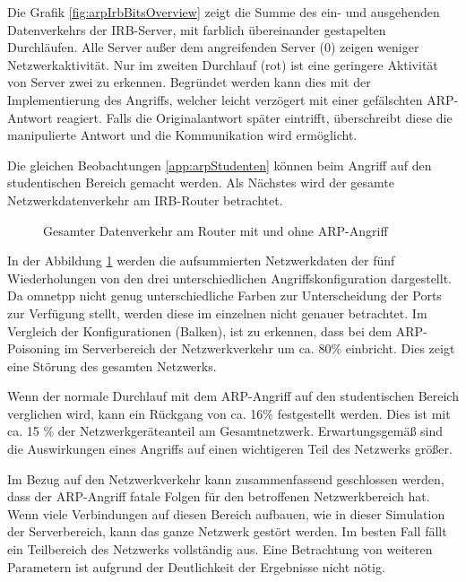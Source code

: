 Die Grafik \ref{fig:arpIrbBitsOverview} zeigt die Summe des ein- und ausgehenden Datenverkehrs der IRB-Server, mit farblich übereinander gestapelten Durchläufen. Alle Server außer dem angreifenden Server (0) zeigen weniger Netzwerkaktivität. Nur im zweiten Durchlauf (rot) ist eine geringere Aktivität von Server zwei zu erkennen. Begründet werden kann dies mit der Implementierung des Angriffs, welcher leicht verzögert mit einer gefälschten ARP-Antwort reagiert. Falls die Originalantwort später eintrifft, überschreibt diese die manipulierte Antwort und die Kommunikation wird ermöglicht.

Die gleichen Beobachtungen \ref{app:arpStudenten} können beim Angriff auf den studentischen Bereich gemacht werden. Als Nächstes wird der gesamte Netzwerkdatenverkehr am IRB-Router betrachtet. 

\begin{figure}[ht]
	\centering
	
	\caption[Gesamter Datenverkehr am Router]{Gesamter Datenverkehr am Router mit und ohne ARP-Angriff}
	\label{fig:arpBitTotal}
\end{figure}

In der Abbildung \ref{fig:arpBitTotal} werden die aufsummierten Netzwerkdaten der fünf Wiederholungen von den drei unterschiedlichen Angriffskonfiguration dargestellt. Da \gls{omnetpp} nicht genug unterschiedliche Farben zur Unterscheidung der Ports zur Verfügung stellt, werden diese im einzelnen nicht genauer betrachtet. Im Vergleich der Konfigurationen (Balken), ist zu erkennen, dass bei dem ARP-Poisoning im Serverbereich der Netzwerkverkehr um {ca.} 80\% einbricht. Dies zeigt eine Störung des gesamten Netzwerks.

Wenn der normale Durchlauf mit dem ARP-Angriff auf den studentischen Bereich verglichen wird, kann ein Rückgang von {ca.} 16\% festgestellt werden. Dies ist mit {ca.} 15 \% der Netzwerkgeräteanteil am Gesamtnetzwerk. Erwartungsgemäß sind die Auswirkungen eines Angriffs auf einen wichtigeren Teil des Netzwerks größer.

Im Bezug auf den Netzwerkverkehr kann zusammenfassend geschlossen werden, dass der ARP-Angriff fatale Folgen für den betroffenen Netzwerkbereich hat. Wenn viele Verbindungen auf diesen Bereich aufbauen, wie in dieser Simulation der Serverbereich, kann das ganze Netzwerk gestört werden. Im besten Fall fällt ein Teilbereich des Netzwerks vollständig aus. Eine Betrachtung von weiteren Parametern ist aufgrund der Deutlichkeit der Ergebnisse nicht nötig.

